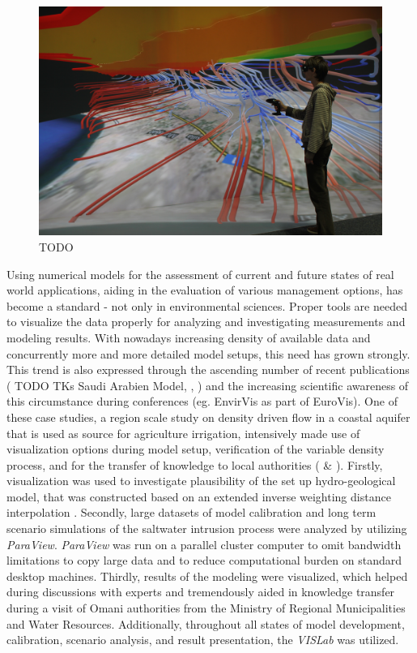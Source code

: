 \begin{figure}
  \includegraphics[width=\linewidth]{images/oman.jpg}
\caption{TODO}
\label{fig:oman}
\end{figure}

Using numerical models for the assessment of current and future states
of real world applications, aiding in the evaluation of various
management options, has become a standard - not only in environmental
sciences. Proper tools are needed to visualize the data properly for
analyzing and investigating measurements and modeling results. With
nowadays increasing density of available data and concurrently more and
more detailed model setups, this need has grown strongly. This trend is
also expressed through the ascending number of recent publications (
TODO TKs Saudi Arabien Model, \cite{sun:ees}, \cite{helbig:envirvis}) and the increasing scientific awareness
of this circumstance during conferences (eg. EnvirVis as part of
EuroVis). One of these case studies, a region scale study on density
driven flow in a coastal aquifer that is used as source for agriculture
irrigation, intensively made use of visualization options during model
setup, verification of the variable density process, and for the
transfer of knowledge to local authorities (\cite{walther:cam} \& \cite{walther:eesenvirvis}). Firstly, visualization was used to investigate plausibility of
the set up hydro-geological model, that was constructed based on an
extended inverse weighting distance interpolation \cite{walther:modelcare}. Secondly, large datasets of model calibration and long term
scenario simulations of the saltwater intrusion process were analyzed by
utilizing \emph{ParaView}. \emph{ParaView} was run on a parallel cluster computer to
omit bandwidth limitations to copy large data and to reduce
computational burden on standard desktop machines. Thirdly, results of
the modeling were visualized, which helped during discussions with
experts and tremendously aided in knowledge transfer during a visit of
Omani authorities from the Ministry of Regional Municipalities and Water
Resources. Additionally, throughout all states of model development,
calibration, scenario analysis, and result presentation, the \emph{VISLab} was
utilized.

